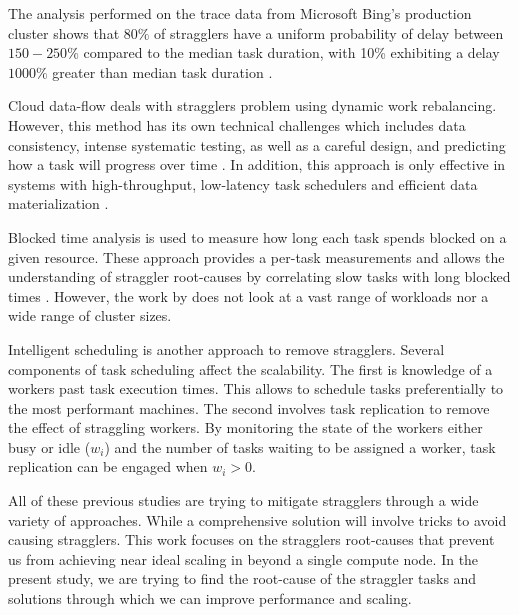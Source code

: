 The analysis performed on the trace data from Microsoft Bing's production cluster shows that $80\%$ of stragglers have a uniform probability of delay between $150-250\%$ 
compared to the median task duration, with 10\% exhibiting a delay $1000\%$ greater than median task duration \cite{Ananthanarayanan2010}.

Cloud data-flow deals with stragglers problem using dynamic work rebalancing. 
However, this method has its own technical challenges which includes data consistency, intense systematic testing, as well as a careful design, and predicting how a task will progress over time \cite{Schmidt2016}.
In addition, this approach is only effective in systems with high-throughput, low-latency task schedulers and efficient data materialization \cite{Rosen2012}.

Blocked time analysis is used to measure how long each task spends blocked on a given resource. 
These approach provides a per-task measurements and allows the understanding of straggler root-causes by correlating slow tasks with long blocked times \cite{Ousterhout2015}. 
However, the work by \cite{Ousterhout2015} does not look at a vast range of workloads nor a wide range of cluster sizes.

Intelligent scheduling \cite{AWE-WQ2014} is another approach to remove stragglers. Several components of task scheduling affect the scalability.
The first is knowledge of a worker\textsc{}s past task execution times. This allows to schedule tasks preferentially to the most performant machines. 
The second involves task replication to remove the effect of straggling workers. 
By monitoring the state of the workers either busy or idle ($w_{i}$) and the number of tasks waiting to be assigned a worker, task replication can be engaged when $w_{i}>0$.

All of these previous studies are trying to mitigate stragglers through a wide variety of approaches.
While a comprehensive solution will involve tricks to avoid causing stragglers. 
This work focuses on the stragglers root-causes that prevent us from achieving near ideal scaling in  beyond a single compute node.
In the present study, we are trying to find the root-cause of the straggler tasks and solutions through which we can improve performance and scaling.

